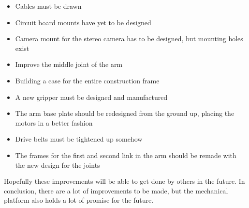 \begin{itemize}
    \item Cables must be drawn
    \item Circuit board mounts have yet to be designed
    \item Camera mount for the stereo camera has to be designed, but mounting holes exist
    \item Improve the middle joint of the arm
    \item Building a case for the entire construction frame
    \item A new gripper must be designed and manufactured
    \item The arm base plate should be redesigned from the ground up, placing the motors in a better fashion
    \item Drive belts must be tightened up somehow
    \item The frames for the first and second link in the arm should be remade with the new design for the joints
\end{itemize}

Hopefully these improvements will be able to get done by others in the future. In conclusion, there are a lot of improvements to be made, but the mechanical platform also holds a lot of promise for the future.




